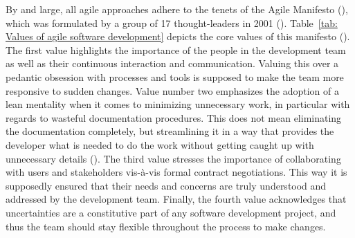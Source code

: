 By and large, all agile approaches adhere to the tenets of the Agile Manifesto (\cite*{AgileManifesto2001}), which was formulated by a group of 17 thought-leaders in 2001 (\cite{Rigby2016a}). Table~\ref{tab: Values of agile software development} depicts the core values of this manifesto (\cite{Dingsoyr2012}). The first value highlights the importance of the people in the development team as well as their continuous interaction and communication. Valuing this over a pedantic obsession with processes and tools is supposed to make the team more responsive to sudden changes. Value number two emphasizes the adoption of a lean mentality when it comes to minimizing unnecessary work, in particular with regards to wasteful documentation procedures. This does not mean eliminating the documentation completely, but streamlining it in a way that provides the developer what is needed to do the work without getting caught up with unnecessary details (\cite{Eby2016}). The third value stresses the importance of collaborating with users and stakeholders vis-à-vis formal contract negotiations. This way it is supposedly ensured that their needs and concerns are truly understood and addressed by the development team. Finally, the fourth value acknowledges that uncertainties are a constitutive part of any software development project, and thus the team should stay flexible throughout the process to make changes.

\begin{wrapfigure}[8]{r}{0.6\textwidth}
	\centering
	\texttt{[image: \{"Latex/THESIS/Figures/Agile"]}.pdf}
	\caption[Agile development process]{Agile development process (author's visualisation)}
	\label{fig:Agile development process}
\end{wrapfigure}

